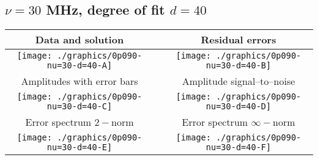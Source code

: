 

% 

\clearpage{}
\break{}

\subsection{$\nu = 30$ MHz, degree of fit $d = 40$}

\begin{table}[h]
    \begin{center}
        \begin{tabular}{ccc}
            Data and solution & \quad & Residual errors \\\hline
            \texttt{[image: ./graphics/0p090-nu=30-d=40-A]} &&
            \texttt{[image: ./graphics/0p090-nu=30-d=40-B]} \\[15pt]
            Amplitudes with error bars && Amplitude signal--to--noise \\\hline
            \texttt{[image: ./graphics/0p090-nu=30-d=40-C]} &&
            \texttt{[image: ./graphics/0p090-nu=30-d=40-D]} \\[15pt]
            Error spectrum $2-$norm && Error spectrum $\infty-$norm \\\hline
            \texttt{[image: ./graphics/0p090-nu=30-d=40-E]} &&
            \texttt{[image: ./graphics/0p090-nu=30-d=40-F]} \\[15pt]
        \end{tabular}
    \end{center}
\label{fig:elev=90, nu=30}
\end{table}



\endinput
